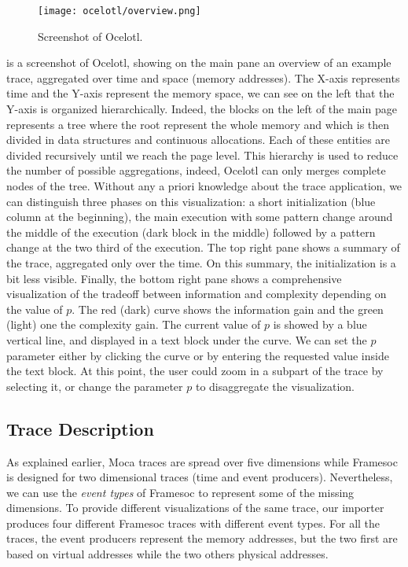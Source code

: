 \begin{figure}[htb]
    \centering
    \texttt{[image: ocelotl/overview.png]}
    \caption{Screenshot of Ocelotl.}
    \label{fig:ocelotl-overview}
\end{figure}

 is a screenshot of \gls{Ocelotl}, showing on the main pane an overview of an example trace, aggregated over time and space (memory addresses).
The X-axis represents time and the Y-axis represent the memory space, we can see on the left that the Y-axis is organized hierarchically.
Indeed, the blocks on the left of the main page represents a tree where the root represent the whole memory and which is then divided in data structures and continuous allocations.
Each of these entities are divided recursively until we reach the page level.
This hierarchy is used to reduce the number of possible aggregations, indeed, \gls{Ocelotl} can only merges complete nodes of the tree.
Without any a priori knowledge about the trace application, we can distinguish three phases on this visualization: a short initialization (blue column at the beginning), the main execution with some pattern change around the middle of the execution (dark block in the middle) followed by a pattern change at the two third of the execution.
The top right pane shows a summary of the trace, aggregated only over the time.
On this summary, the initialization is a bit less visible.
Finally, the bottom right pane shows a comprehensive visualization of the tradeoff between information and complexity depending on the value of $p$.
The red (dark) curve shows the information gain and the green (light) one the complexity gain.
The current value of $p$ is showed by a blue vertical line, and displayed in a text block under the curve.
We can set the $p$ parameter either by clicking the curve or by entering the requested value inside the text block.
At this point, the user could zoom in a subpart of the trace by selecting it, or change the parameter $p$ to disaggregate the visualization.

\subsection{Trace Description}

As explained earlier, \gls{Moca} traces are spread over five dimensions while \gls{Framesoc} is designed for two dimensional traces (time and event producers).
Nevertheless, we can use the \emph{event types} of \gls{Framesoc} to represent some of the missing dimensions.
To provide different visualizations of the same trace, our importer produces four different \gls{Framesoc} traces with different event types.
For all the traces, the event producers represent the memory addresses, but the two first are based on virtual addresses while the two others physical addresses.

